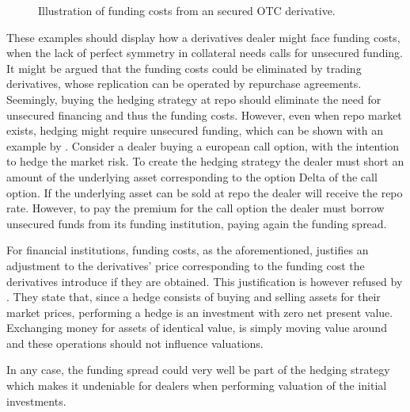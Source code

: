 \documentclass[main.tex]{subfiles}
\begin{document}
        \begin{figure}
            \centering
            \resizebox{\textwidth}{!}{%
            \begin{tikzpicture}
                
            \end{tikzpicture}        
            }   
            \caption{Illustration of funding costs from an secured OTC derivative.}
            \label{fig:funding-costs-secured-derivative}
        \end{figure}

        These examples should display how a derivatives dealer might face funding costs,
        when the lack of perfect symmetry in collateral needs calls for unsecured funding.
        It might be argued that the funding costs could be eliminated by trading derivatives,
        whose replication can be operated by repurchase agreements. 
        Seemingly, buying the hedging strategy at repo should eliminate the need for unsecured financing
        and thus the funding costs. 
        However, even when repo market exists, hedging might require unsecured funding,
        which can be shown with an example by \textcite{Castagna2012FVA}.
        Consider a dealer buying a european call option, with the intention to hedge the market risk.
        To create the hedging strategy the dealer must short an amount of the underlying asset corresponding to the option Delta of the call option.
        If the underlying asset can be sold at repo the dealer will receive the repo rate.
        However, to pay the premium for the call option the dealer must borrow unsecured funds from its funding institution,
        paying again the funding spread. 

        For financial institutions, funding costs, as the aforementioned, justifies an adjustment 
        to the derivatives' price corresponding to the funding cost the derivatives introduce if they are obtained.
        This justification is however refused by \textcite{HullWhite2012FVA}.
        They state that, since a hedge consists of buying and selling assets for their market prices,
        performing a hedge is an investment with zero net present value.
        Exchanging money for assets of identical value,
        is simply moving value around and these operations should not influence valuations. 

        In any case,
        the funding spread could very well be part of the hedging strategy which makes it undeniable for dealers when performing valuation of the initial investments.
\end{document}
